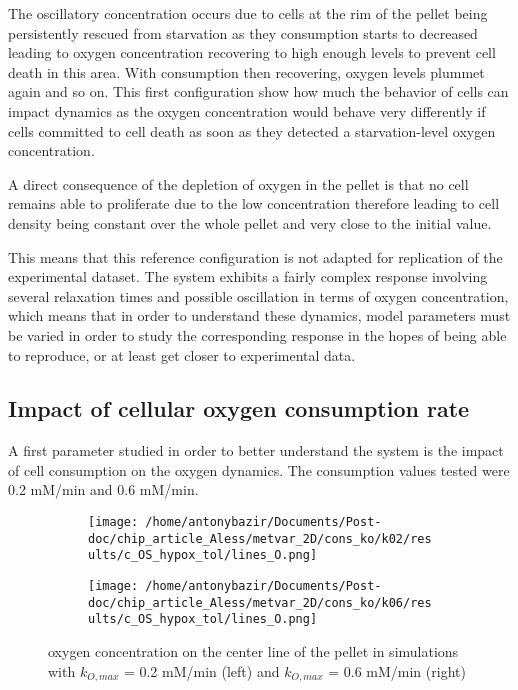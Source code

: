 \documentclass[11pt,a4paper]{article}
\begin{document}
The oscillatory concentration occurs due to cells at the rim of the pellet being persistently rescued from starvation as they consumption starts to decreased leading to oxygen concentration recovering to high enough levels to prevent cell death in this area. With consumption then recovering, oxygen levels plummet again and so on. This first configuration show how much the behavior of cells can impact dynamics as the oxygen concentration would behave very differently if cells committed to cell death as soon as they detected a starvation-level oxygen concentration.

A direct consequence of the depletion of oxygen in the pellet is that no cell remains able to proliferate due to the low concentration therefore leading to cell density being constant over the whole pellet and very close to the initial value. 

This means that this reference configuration is not adapted for replication of the experimental dataset. The system exhibits a fairly complex response involving several relaxation times and possible oscillation in terms of oxygen concentration, which means that in order to understand these dynamics, model parameters must be varied in order to study the corresponding response in the hopes of being able to reproduce, or at least get closer to experimental data.

\subsection{Impact of cellular oxygen consumption rate} 
A first parameter studied in order to better understand the system is the impact of cell consumption on the oxygen dynamics. The consumption values tested were 0.2 mM/min  and 0.6 mM/min.

\begin{figure}[ht!]
\begin{subfigure}{0.44\textwidth}
	\centering
	\texttt{[image: /home/antonybazir/Documents/Post-doc/chip\_article\_Aless/metvar\_2D/cons\_ko/k02/results/c\_OS\_hypox\_tol/lines\_O.png]}
\end{subfigure}
\begin{subfigure}{0.44\textwidth}
	\centering
	\texttt{[image: /home/antonybazir/Documents/Post-doc/chip\_article\_Aless/metvar\_2D/cons\_ko/k06/results/c\_OS\_hypox\_tol/lines\_O.png]}
\end{subfigure}
\caption{oxygen concentration on the center line of the pellet in simulations with $k_{O,max}$ = 0.2 mM/min (left) and $k_{O,max}$ = 0.6 mM/min (right) \label{kcons_map}}
\end{figure}
\end{document}
